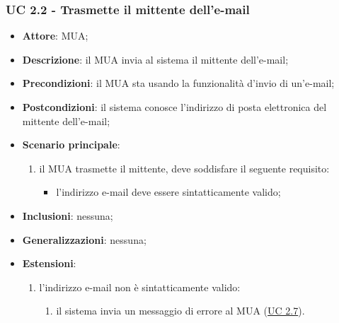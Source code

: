     \subsubsection{UC 2.2 - Trasmette il mittente dell'e-mail} \label{sec:UC2.2}
    \begin{itemize}
        \item \textbf{Attore}: MUA;
        \item \textbf{Descrizione}: il MUA invia al sistema il mittente dell'e-mail;
        \item \textbf{Precondizioni}: il MUA sta usando la funzionalità d'invio di un'e-mail;
        \item \textbf{Postcondizioni}: il sistema conosce l'indirizzo di posta elettronica del mittente dell'e-mail;
        \item \textbf{Scenario principale}:
            \begin{enumerate}
                \item il MUA trasmette il mittente, deve soddisfare il seguente requisito:
                    \begin{itemize}
                        \item l'indirizzo e-mail deve essere sintatticamente valido;
                    \end{itemize}
            \end{enumerate}
        \item \textbf{Inclusioni}: nessuna;
        \item \textbf{Generalizzazioni}: nessuna;
        \item \textbf{Estensioni}:
            \begin{enumerate}[label=\alph*.]
                \item l'indirizzo e-mail non è sintatticamente valido:
                \begin{enumerate}[label=\arabic*.]
                    \item il sistema invia un messaggio di errore al MUA (\hyperref[sec:UC2.7]{UC 2.7}).
                \end{enumerate}
            \end{enumerate}
    \end{itemize}

